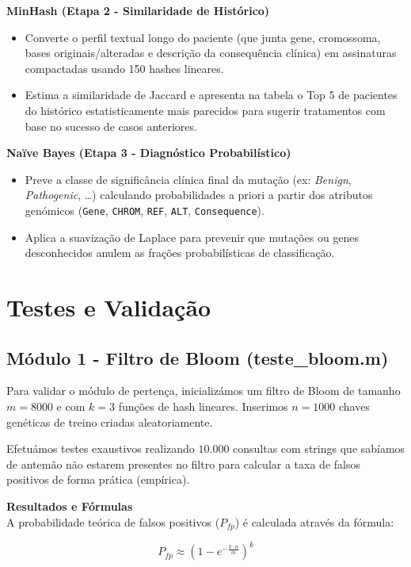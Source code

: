 \documentclass[11pt,a4paper]{article}
\begin{document}
\noindent\textbf{MinHash (Etapa 2 - Similaridade de Histórico)}
\begin{itemize}
    \item Converte o perfil textual longo do paciente (que junta gene, cromossoma, bases originais/alteradas e descrição da consequência clínica) em assinaturas compactadas usando 150 hashes lineares.
    \item Estima a similaridade de Jaccard e apresenta na tabela o Top 5 de pacientes do histórico estatisticamente mais parecidos para sugerir tratamentos com base no sucesso de casos anteriores.
\end{itemize}
\newpage
\noindent\textbf{Naïve Bayes (Etapa 3 - Diagnóstico Probabilístico)}
\begin{itemize}
    \item Preve a classe de significância clínica final da mutação (ex: \textit{Benign}, \textit{Pathogenic}, \dots) calculando probabilidades a priori a partir dos atributos genómicos (\texttt{Gene}, \texttt{CHROM}, \texttt{REF}, \texttt{ALT}, \texttt{Consequence}).
    \item Aplica a suavização de Laplace para prevenir que mutações ou genes desconhecidos anulem as frações probabilísticas de classificação.
\end{itemize}

\section*{Testes e Validação}

\subsection*{Módulo 1 - Filtro de Bloom (teste\_bloom.m)}
Para validar o módulo de pertença, inicializámos um filtro de Bloom de tamanho $m = 8000$ e com $k = 3$ funções de hash lineares. Inserimos $n = 1000$ chaves genéticas de treino criadas aleatoriamente.

Efetuámos testes exaustivos realizando $10.000$ consultas com strings que sabíamos de antemão não estarem presentes no filtro para calcular a taxa de falsos positivos de forma prática (empírica).

\vspace{0.5cm}
\noindent\textbf{Resultados e Fórmulas} \\
A probabilidade teórica de falsos positivos ($P_{fp}$) é calculada através da fórmula:

\[
P_{fp} \approx \left(1 - e^{-\frac{k \cdot n}{m}}\right)^k
\]
\end{document}
